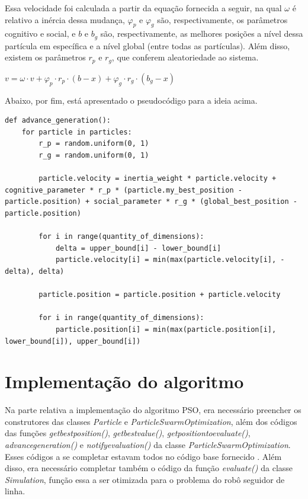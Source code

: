 \documentclass[conference]{IEEEtran}
\begin{document}
Essa velocidade foi calculada a partir da equação fornecida a seguir, na qual $\omega$ é relativo a inércia dessa mudança, $\varphi_p$ e $\varphi_g$ são, respectivamente, os parâmetros cognitivo e social, e $b$ e $b_g$ são, respectivamente, as melhores posições a nível dessa partícula em específica e a nível global (entre todas as partículas). Além disso, existem os parâmetros $r_p$ e $r_g$, que conferem aleatoriedade ao sistema.

$v = \omega \cdot v + \varphi_p \cdot r_p \cdot \left ( b - x \right ) + \varphi_g \cdot r_g \cdot \left ( b_g - x \right )$

Abaixo, por fim, está apresentado o pseudocódigo para a ideia acima.

\begin{lstlisting}
def advance_generation():
	for particle in particles:
		r_p = random.uniform(0, 1)
		r_g = random.uniform(0, 1)

		particle.velocity = inertia_weight * particle.velocity + cognitive_parameter * r_p * (particle.my_best_position - particle.position) + social_parameter * r_g * (global_best_position - particle.position)

		for i in range(quantity_of_dimensions):
			delta = upper_bound[i] - lower_bound[i]
    		particle.velocity[i] = min(max(particle.velocity[i], -delta), delta)
		
		particle.position = particle.position + particle.velocity

		for i in range(quantity_of_dimensions):
    		particle.position[i] = min(max(particle.position[i], lower_bound[i]), upper_bound[i])
\end{lstlisting}

\section{Implementação do algoritmo}
Na parte relativa a implementação do algoritmo PSO, era necessário preencher os construtores das classes \textit{Particle} e \textit{ParticleSwarmOptimization}, além dos códigos das funções \textit{get\underline{\space}best\underline{\space}position()}, \textit{get\underline{\space}best\underline{\space}value()}, \textit{get\underline{\space}position\underline{\space}to\underline{\space}evaluate()}, \textit{advance\underline{\space}generation()} e \textit{notify\underline{\space}evaluation()} da classe \textit{ParticleSwarmOptimization}. Esses códigos a se completar estavam todos no código base fornecido \cite{b1}.  Além disso, era necessário completar também o código da função \textit{evaluate()} da classe \textit{Simulation}, função essa a ser otimizada para o problema do robô seguidor de linha. 
\end{document}

